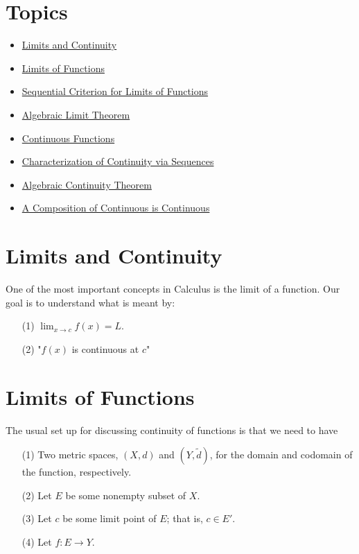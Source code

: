 \documentclass[a4paper]{article}
\begin{document}
\section{Topics}

\begin{itemize}
    \item {\hyperref[Limits and Continuity]{Limits and Continuity}} 
    \item {\hyperref[Limits of Functions]{Limits of Functions}}
    \item {\hyperref[Sequential Criterion for Limits of Functions]{Sequential Criterion for Limits of Functions}}
    \item {\hyperref[Algebraic Limit Theorem]{Algebraic Limit Theorem}}
    \item {\hyperref[Continuous Functions]{Continuous Functions}}
    \item {\hyperref[Characterization of Continuity via Sequences]{Characterization of Continuity via Sequences}}
    \item {\hyperref[Algebraic Continuity Theorem]{Algebraic Continuity Theorem}}
    \item {\hyperref[A Composition of Continuous Functions is Continuous]{A Composition of Continuous is Continuous}}
\end{itemize}

\section{Limits and Continuity}\label{Limits and Continuity}

One of the most important concepts in Calculus is the limit of a function. Our goal is to understand what is meant by:
\begin{enumerate}
    \item[(1)] \( \lim_{ x \to c }  f(x) = L \).
    \item[(2)] "\( f(x) \) is continuous at \( c \)"
\end{enumerate}

\section{Limits of Functions}\label{Limits of Functions}

The usual set up for discussing continuity of functions is that we need to have  
\begin{enumerate}
    \item[(1)] Two metric spaces, \( (X,d) \) and \( (Y, \tilde{d}) \), for the domain and codomain of the function, respectively.
    \item[(2)] Let \( E  \) be some nonempty subset of \( X  \).
    \item[(3)] Let \( c  \) be some limit point of \( E  \); that is, \( c \in E' \).
    \item[(4)] Let \( f: E \to Y \).
\end{enumerate}
\end{document}
